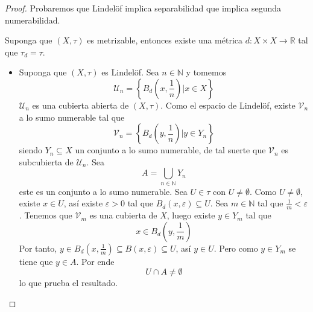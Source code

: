 \documentclass[12pt]{report}
\theoremstyle{largebreak}
\newcommand\cf[3]{\ensuremath{#1:#2\rightarrow#3}}
\begin{document}
    \begin{proof}
        Probaremos que Lindelöf implica separabilidad que implica segunda numerabilidad.

        Suponga que $(X,\tau)$ es metrizable, entonces existe una métrica $\cf{d}{X\times X}{\mathbb{R}}$ tal que $\tau_d=\tau$.
        \begin{itemize}
            \item Suponga que $(X,\tau)$ es Lindelöf. Sea $n\in\mathbb{N}$ y tomemos
            \begin{equation*}
                \mathcal{U}_n=\left\{B_d\left(x,\frac{1}{n}\right) \Big|x\in X \right\}
            \end{equation*}
            $\mathcal{U}_n$ es una cubierta abierta de $(X,\tau)$. Como el espacio de Lindelöf, existe $\mathcal{V}_n$ a lo sumo numerable tal que
            \begin{equation*}
                \mathcal{V}_n=\left\{B_d\left(y,\frac{1}{n} \right)\Big|y\in Y_n \right\}
            \end{equation*}
            siendo $Y_n\subseteq X$ un conjunto a lo sumo numerable, de tal suerte que $\mathcal{V}_n$ es subcubierta de $\mathcal{U}_n$. Sea
            \begin{equation*}
                A=\bigcup_{n\in\mathbb{N}}Y_n
            \end{equation*}
            este es un conjunto a lo sumo numerable. Sea $U\in\tau$ con $U\neq\emptyset$. Como $U\neq\emptyset$, existe $x\in U$, así existe $\varepsilon>0$ tal que $B_d(x,\varepsilon)\subseteq U$. Sea $m\in\mathbb{N}$ tal que $\frac{1}{m}<\varepsilon$. Tenemos que $\mathcal{V}_m$ es una cubierta de $X$, luego existe $y\in Y_m$ tal que
            \begin{equation*}
                x\in B_d\left(y,\frac{1}{m}\right)
            \end{equation*}
            Por tanto, $y\in B_d\left(x,\frac{1}{m} \right)\subseteq B(x,\varepsilon)\subseteq U$, así $y\in U$. Pero como $y\in Y_m$ se tiene que $y\in A$. Por ende
            \begin{equation*}
                U\cap A\neq\emptyset
            \end{equation*}
            lo que prueba el resultado.


\end{itemize}
\end{proof}
\end{document}
